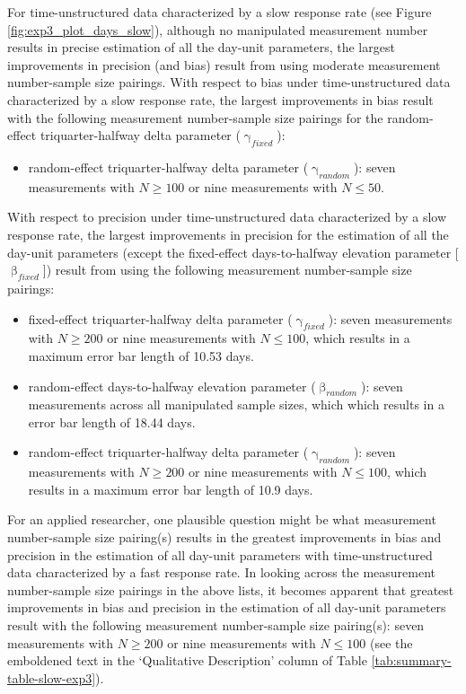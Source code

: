 \documentclass[
12pt, %
twoside,
english]{guelphthesis}
\theoremstyle{definition}
\theoremstyle{definition}
\theoremstyle{definition}
\theoremstyle{definition}
\theoremstyle{remark}
\begin{document}
For time-unstructured data characterized by a slow response rate (see Figure \ref{fig:exp3_plot_days_slow}), although no manipulated measurement number results in precise estimation of all the day-unit parameters, the largest improvements in precision (and bias) result from using moderate measurement number-sample size pairings. With respect to bias under time-unstructured data characterized by a slow response rate, the largest improvements in bias result with the following measurement number-sample size pairings for the random-effect triquarter-halfway delta parameter (\(\upgamma_{fixed}\)):
\begin{itemize}
\tightlist
\item
  random-effect triquarter-halfway delta parameter (\(\upgamma_{random}\)): seven measurements with \(N \ge 100\) or nine measurements with \(N \le 50\).
\end{itemize}
\noindent With respect to precision under time-unstructured data characterized by a slow response rate, the largest improvements in precision for the estimation of all the day-unit parameters (except the fixed-effect days-to-halfway elevation parameter {[}\(\upbeta_{fixed}\){]}) result from using the following measurement number-sample size pairings:
\begin{itemize}
\tightlist
\item
  fixed-effect triquarter-halfway delta parameter (\(\upgamma_{fixed}\)): seven measurements with \(N \ge 200\) or nine measurements with \(N \le 100\), which results in a maximum error bar length of 10.53 days.
\item
  random-effect days-to-halfway elevation parameter (\(\upbeta_{random}\)): seven measurements across all manipulated sample sizes, which which results in a error bar length of 18.44 days.
\item
  random-effect triquarter-halfway delta parameter (\(\upgamma_{random}\)): seven measurements with \(N \ge 200\) or nine measurements with \(N \le 100\), which results in a maximum error bar length of 10.9 days.
\end{itemize}
For an applied researcher, one plausible question might be what measurement number-sample size pairing(s) results in the greatest improvements in bias and precision in the estimation of all day-unit parameters with time-unstructured data characterized by a fast response rate. In looking across the measurement number-sample size pairings in the above lists, it becomes apparent that greatest improvements in bias and precision in the estimation of all day-unit parameters result with the following measurement number-sample size pairing(s): seven measurements with \(N \ge 200\) or nine measurements with \(N \le 100\) (see the emboldened text in the `Qualitative Description' column of Table \ref{tab:summary-table-slow-exp3}).
\end{document}
